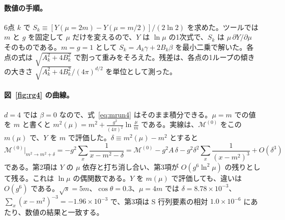 \documentclass[a4paper,10pt]{ltjsarticle}
\begin{document}
\paragraph{数値の手順。}6点 $k$ で $S_k\equiv[Y(\mu=2m)-Y(\mu=m/2)]/(2\ln2)$ を求めた。ツールでは $m$ と $g$ を固定して $\mu$ だけを変えるので、$Y$ は $\ln\mu$ の1次式で、$S_k$ は $\mu\,\partial Y/\partial\mu$ そのものである。$m=g=1$ として $S_k=A_k\gamma+2B_k\beta$ を最小二乗で解いた。各点の式は $\sqrt{A_k^2+4B_k^2}$ で割って重みをそろえた。残差は、各点の1ループの傾きの大きさ $\sqrt{A_k^2+4B_k^2}/(4\pi)^{d/2}$ を単位として測った。

\paragraph{図~\ref{fig:rg4} の曲線。}$d=4$ では $\beta=0$ なので、式~\eqref{eq:mrun4} はそのまま積分できる。$\mu=m$ での値を $m$ と書くと $m^2(\mu)=m^2+\frac{g^2}{(4\pi)^2}\ln\frac{\mu}{m}$ である。実線は、$\mathcal{M}^{(0)}$ をこの $m(\mu)$ で、$Y$ を $m$ で評価した。$\delta\equiv m^2(\mu)-m^2$ とすると
\begin{equation*}
\mathcal{M}^{(0)}\big|_{m^2\to m^2+\delta}=-g^2\sum_x\frac{1}{x-m^2-\delta}=\mathcal{M}^{(0)}-g^2A\,\delta-g^2\delta^2\sum_x\frac{1}{(x-m^2)^3}+O(\delta^3)
\end{equation*}
である。第2項は $Y$ の $\mu$ 依存と打ち消し合い、第3項が $O(g^6\ln^2\mu)$ の残りとして残る。これは $\ln\mu$ の偶関数である。$Y$ を $m(\mu)$ で評価しても、違いは $O(g^6)$ である。$\sqrt s=5m$、$\cos\theta=0.3$、$\mu=4m$ では $\delta=8.78\times10^{-3}$、$\sum_x(x-m^2)^{-3}=-1.96\times10^{-3}$ で、第3項は S 行列要素の相対 $1.0\times10^{-6}$ にあたり、数値の結果と一致する。
\end{document}
